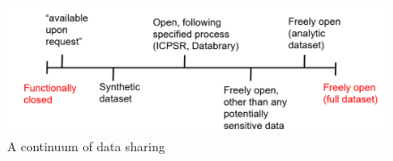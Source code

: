 \documentclass[authordate, empirical,issue]{jote-new-article}
\begin{document}
\begin{figure}
  \begin{fullwidth}
    \includegraphics[width=\linewidth]{media/image1.png}

    \caption{A continuum of data sharing}

    \label{fig:rId10}

  \end{fullwidth}

\end{figure}
\end{document}
